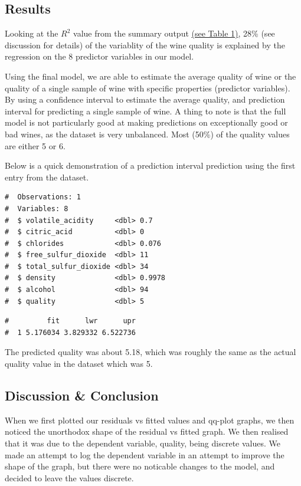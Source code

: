 \documentclass[a4paper,9pt,twocolumn,twoside,]{pinp}
\begin{document}
\subsection{Results}\label{results}

Looking at the \(R^2\) value from the summary output
\hyperref[table-1]{(see Table 1)}, 28\% (see discussion for details) of
the variablity of the wine quality is explained by the regression on the
8 predictor variables in our model.

Using the final model, we are able to estimate the average quality of
wine or the quality of a single sample of wine with specific properties
(predictor variables). By using a confidence interval to estimate the
average quality, and prediction interval for predicting a single sample
of wine. A thing to note is that the full model is not particularly good
at making predictions on exceptionally good or bad wines, as the dataset
is very unbalanced. Most (50\%) of the quality values are either 5 or 6.

Below is a quick demonstration of a prediction interval prediction using
the first entry from the dataset.

\begin{ShadedResult}
\begin{verbatim}
#  Observations: 1
#  Variables: 8
#  $ volatile_acidity     <dbl> 0.7
#  $ citric_acid          <dbl> 0
#  $ chlorides            <dbl> 0.076
#  $ free_sulfur_dioxide  <dbl> 11
#  $ total_sulfur_dioxide <dbl> 34
#  $ density              <dbl> 0.9978
#  $ alcohol              <dbl> 94
#  $ quality              <dbl> 5
\end{verbatim}
\end{ShadedResult}\begin{ShadedResult}
\begin{verbatim}
#         fit      lwr      upr
#  1 5.176034 3.829332 6.522736
\end{verbatim}
\end{ShadedResult}

The predicted quality was about 5.18, which was roughly the same as the
actual quality value in the dataset which was 5.

\subsection{Discussion \& Conclusion}\label{discussion-conclusion}

When we first plotted our residuals vs fitted values and qq-plot graphs,
we then noticed the unorthodox shape of the residual vs fitted graph. We
then realised that it was due to the dependent variable, quality, being
discrete values. We made an attempt to log the dependent variable in an
attempt to improve the shape of the graph, but there were no noticable
changes to the model, and decided to leave the values discrete.
\end{document}
